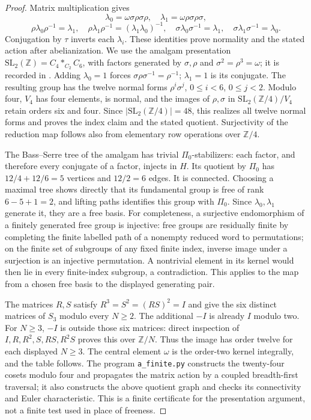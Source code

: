 \begin{proof}
Matrix multiplication gives
\[
 \lambda_0=\omega\sigma\rho\sigma\rho,\quad
 \lambda_1=\omega\rho\sigma\rho\sigma,
\]
\[
 \rho\lambda_0\rho^{-1}=\lambda_1,\quad
 \rho\lambda_1\rho^{-1}=(\lambda_1\lambda_0)^{-1},\quad
 \sigma\lambda_0\sigma^{-1}=\lambda_1,\quad
 \sigma\lambda_1\sigma^{-1}=\lambda_0.
\]
Conjugation by $\tau$ inverts each $\lambda_i$. These identities prove
normality and the stated action after abelianization. We use the
amalgam presentation
$\mathrm{SL}_2(\mathbb Z)=C_4*_{C_2}C_6$, with factors generated by
$\sigma,\rho$ and $\sigma^2=\rho^3=\omega$; it is recorded in
\cite[\S4, equation (1)]{A_KirschmerLeedhamGreen}. Adding $\lambda_0=1$
forces $\sigma\rho\sigma^{-1}=\rho^{-1}$; $\lambda_1=1$ is its
conjugate. The resulting group has the twelve normal forms
$\rho^i\sigma^j$, $0\leq i<6$, $0\leq j<2$.
Modulo four, $V_4$ has four elements, is normal, and the images of
$\rho,\sigma$ in $\mathrm{SL}_2(\mathbb Z/4)/V_4$ retain orders six
and four. Since $|\mathrm{SL}_2(\mathbb Z/4)|=48$, this realizes all
twelve normal forms and proves the index claim and the stated quotient.
Surjectivity of the reduction map follows also from elementary row
operations over $\mathbb Z/4$.

The Bass--Serre tree of the amalgam has trivial $\Pi_0$-stabilizers:
each factor, and therefore every conjugate of a factor, injects in
$H$. Its quotient by $\Pi_0$ has $12/4+12/6=5$ vertices and
$12/2=6$ edges. It is connected. Choosing a maximal tree shows directly
that its fundamental group is free of rank $6-5+1=2$, and lifting paths
identifies this group with $\Pi_0$. Since $\lambda_0,\lambda_1$ generate
it, they are a free basis. For completeness, a surjective endomorphism
of a finitely generated free group is injective: free groups are
residually finite by completing the finite labelled path of a nonempty
reduced word to permutations; on the finite set of subgroups of any
fixed finite index, inverse image under a surjection is an injective
permutation. A nontrivial element in its kernel would then lie in every
finite-index subgroup, a contradiction. This applies to the map from
a chosen free basis to the displayed generating pair.

The matrices $R,S$ satisfy $R^3=S^2=(RS)^2=I$ and give the six
distinct matrices of $S_3$ modulo every $N\geq2$. The additional
$-I$ is already $I$ modulo two. For $N\geq3$, $-I$ is outside those
six matrices: direct inspection of
$I,R,R^2,S,RS,R^2S$ proves this over $\mathbb Z/N$.
Thus the image has order twelve for each displayed $N\geq3$.
The central element $\omega$ is the order-two kernel integrally, and
the table follows. The program \texttt{a\_finite.py} constructs the
twenty-four cosets modulo four and propagates the matrix action by a
coupled breadth-first traversal; it also constructs the above quotient
graph and checks its connectivity and Euler characteristic. This is a
finite certificate for the presentation argument, not a finite test
used in place of freeness.
\end{proof}

